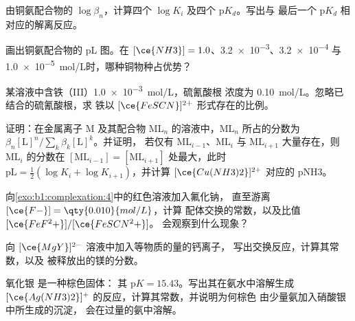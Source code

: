 \begin{exercise}[$\star$]\label{exo:b1:complexation:2}
由铜氨配合物的 $\log\beta_n$，计算四个 $\log K_i$
及四个 $\mathrm{p}K_d$。写出与
最后一个 $\mathrm{p}K_d$ 相对应的解离反应。
\end{exercise}

\begin{exercise}[$\star$]\label{exo:b1:complexation:3}
画出铜氨配合物的 pL 图。在
$[\ce{NH3}] = 1.0$、\num{3.2e-3}、\num{3.2e-4} 与
\qty{1.0e-5}{mol/L}时，哪种铜物种占优势？
\end{exercise}

\begin{exercise}[$\star$]\label{exo:b1:complexation:4}
某溶液中含铁（III）\qty{1.0e-3}{mol/L}，硫氰酸根
浓度为 \qty{0.10}{mol/L}。忽略已结合的硫氰酸根，求
铁以 $[\ce{FeSCN}]^{2+}$ 形式存在的比例。
\end{exercise}

\begin{exercise}[$\star\star$]\label{exo:b1:complexation:5}
证明：在金属离子 M 及其配合物
$\mathrm{ML}_n$ 的溶液中，$\mathrm{ML}_n$ 所占的分数为
$\beta_n[\mathrm{L}]^n / \sum_{k} \beta_k[\mathrm{L}]^k$。并证明，
若仅有 $\mathrm{ML}_{i-1}$、$\mathrm{ML}_i$ 与 $\mathrm{ML}_{i+1}$ 大量存在，则
$\mathrm{ML}_i$ 的分数在
$[\mathrm{ML}_{i-1}] = [\mathrm{ML}_{i+1}]$ 处最大，此时
$\mathrm{pL} = \frac12(\log K_i + \log K_{i+1})$，并计算
$[\ce{Cu(NH3)2}]^{2+}$ 对应的 pNH3。
\end{exercise}

\begin{exercise}[$\star\star$]\label{exo:b1:complexation:6}
向\cref{exo:b1:complexation:4}中的红色溶液加入氟化钠，
直至游离 $[\ce{F-}] = \qty{0.010}{mol/L}$，计算
配体交换的常数，以及比值 $[\ce{FeF^2+}]/[\ce{FeSCN^2+}]$。
会观察到什么现象？
\end{exercise}

\begin{exercise}[$\star\star$]\label{exo:b1:complexation:7}
向 $[\ce{MgY}]^{2-}$ 溶液中加入等物质的量的钙离子，
写出交换反应，计算其常数，以及
被释放出的镁的分数。
\end{exercise}

\begin{exercise}[$\star\star$]\label{exo:b1:complexation:8}
氧化银  是一种棕色固体：
其 $\mathrm{p}K = 15.43$。写出其在氨水中溶解生成
$[\ce{Ag(NH3)2}]^{+}$ 的反应，计算其常数，并说明为何棕色
由少量氨加入硝酸银中所生成的沉淀，
会在过量的氨中溶解。
\end{exercise}

